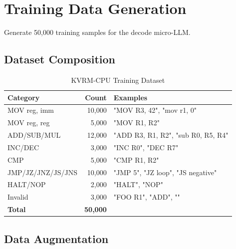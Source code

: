 \documentclass[11pt,a4paper]{article}
\begin{document}
\section{Training Data Generation}

Generate 50,000 training samples for the decode micro-LLM.

\subsection{Dataset Composition}

\begin{table}[h]
\centering
\begin{tabular}{lrl}
\toprule
\textbf{Category} & \textbf{Count} & \textbf{Examples} \\
\midrule
MOV reg, imm & 10,000 & "MOV R3, 42", "mov r1, 0" \\
MOV reg, reg & 5,000 & "MOV R1, R2" \\
ADD/SUB/MUL & 12,000 & "ADD R3, R1, R2", "sub R0, R5, R4" \\
INC/DEC & 3,000 & "INC R0", "DEC R7" \\
CMP & 5,000 & "CMP R1, R2" \\
JMP/JZ/JNZ/JS/JNS & 10,000 & "JMP 5", "JZ loop", "JS negative" \\
HALT/NOP & 2,000 & "HALT", "NOP" \\
Invalid & 3,000 & "FOO R1", "ADD", "" \\
\midrule
\textbf{Total} & \textbf{50,000} & \\
\bottomrule
\end{tabular}
\caption{KVRM-CPU Training Dataset}
\end{table}

\subsection{Data Augmentation}
\end{document}
